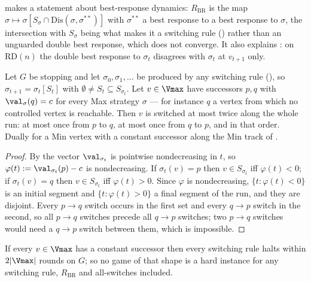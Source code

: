 \begin{remark}\label{bsc:double-br-rem}
 makes  a statement about best-response
dynamics: $R_{\mathrm{BR}}$ is the map
$\sigma\mapsto\sigma[S_\sigma\cap\mathrm{Dis}(\sigma,\sigma^{\ast\ast})]$ with
$\sigma^{\ast\ast}$ a best response to a best response to $\sigma$, the
intersection with $S_\sigma$ being what makes it a switching rule
() rather than an unguarded double best response, which does
not converge.  It also explains : on $\mathrm{RD}(n)$ the
double best response to $\sigma_t$ disagrees with $\sigma_t$ at
$v_{t+1}$ only.
\end{remark}

\begin{lemma}\label{bsc:const}
Let $G$ be stopping and let $\sigma_0,\sigma_1,\dots$ be produced by any
switching rule (), so $\sigma_{t+1}=\sigma_t[S_t]$ with
$\emptyset\ne S_t\subseteq S_{\sigma_t}$.  Let $v\in\Vmax$ have successors
$p,q$ with $\val_{\sigma}(q)=c$ for every Max strategy $\sigma$ --- for
instance $q$ a vertex from which no controlled vertex is reachable.  Then $v$
is switched at most twice along the whole run: at most once from $p$ to $q$,
at most once from $q$ to $p$, and in that order.  Dually for a Min vertex with
a constant successor along the Min track of .
\end{lemma}

\begin{proof}
By  the vector $\val_{\sigma_t}$ is pointwise nondecreasing in
$t$, so $\varphi(t):=\val_{\sigma_t}(p)-c$ is nondecreasing.  If
$\sigma_t(v)=p$ then $v\in S_{\sigma_t}$ iff $\varphi(t)<0$; if
$\sigma_t(v)=q$ then $v\in S_{\sigma_t}$ iff $\varphi(t)>0$.  Since $\varphi$
is nondecreasing, $\{t:\varphi(t)<0\}$ is an initial segment and
$\{t:\varphi(t)>0\}$ a final segment of the run, and they are disjoint.  Every
$p\to q$ switch occurs in the first set and every $q\to p$ switch in the
second, so all $p\to q$ switches precede all $q\to p$ switches; two $p\to q$
switches would need a $q\to p$ switch between them, which is impossible.
\end{proof}

\begin{corollary}\label{bsc:const-cor}
If every $v\in\Vmax$ has a constant successor then every switching rule halts
within $2|\Vmax|$ rounds on $G$; so no game of that shape is a hard instance
for any switching rule, $R_{\mathrm{BR}}$ and all-switches included.
\end{corollary}

